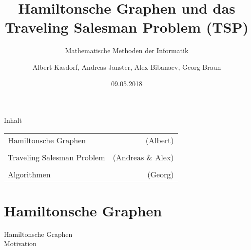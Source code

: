 \documentclass{beamer}
\title[Hamiltonsche Grafen und das TSP]{Hamiltonsche Graphen und das\\ Traveling Salesman Problem (TSP)}
\subtitle{Mathematische Methoden der Informatik}
\author[]
{
	Albert Kasdorf, Andreas Janster, Alex Bibanaev, Georg Braun
}
\institute[FH Aachen]
{
	FH Aachen\\
	Fachbereich Elektrotechnik und Informationstechnik\\
	Ingenieur-Informatik
}
\date{09.05.2018}
\begin{document}
%
%
\frame{\titlepage}


%
%
\begin{frame}{Inhalt}


	\begin{tabular}{ l r }
		Hamiltonsche Graphen & (Albert) \\
		\\
		Traveling Salesman Problem & (Andreas \& Alex) \\
		\\
		Algorithmen & (Georg)
	\end{tabular}

\end{frame}


%
%
%
\part{Hamiltonsche Graphen}


%
%
%
\begin{frame}{Hamiltonsche Graphen\\\normalsize{Motivation}}
\end{frame}
\end{document}
